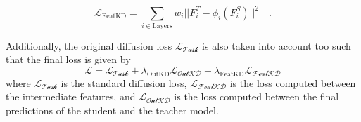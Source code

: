 \begin{equation}
	\mathcal{L}_\text{FeatKD} = \sum_{i \in \text{Layers}} w_i || F_i^T - \phi_i(F_i^S) ||^2 \quad.
\end{equation}

  Additionally, the original diffusion loss $\mathcal{L_\text{Task}}$ is also taken into account too such that the final loss is given by 
\begin{equation}
	\label{eq:KnowledgeDistillationLoss}
	\mathcal{L} = \mathcal{L_\text{Task}} + \lambda_\text{OutKD} \mathcal{L_\text{OutKD}} + \lambda_\text{FeatKD} \mathcal{L_\text{FeatKD}}
\end{equation}
where $\mathcal{L_\text{Task}}$ is the standard diffusion loss, $\mathcal{L_\text{FeatKD}}$ is the loss computed between the intermediate features, and $\mathcal{L_\text{OutKD}}$ is the loss computed between the final predictions of the student and the teacher model.